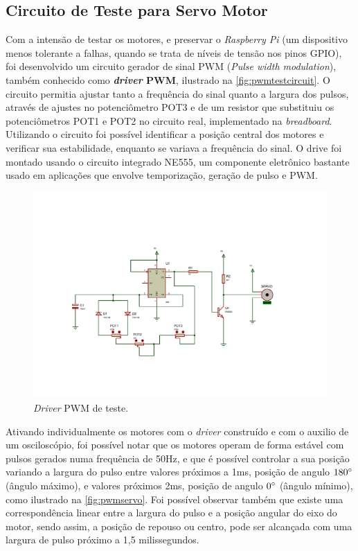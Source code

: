 \subsection{Circuito de Teste para Servo Motor}
\label{subsec:servotester}

Com a intensão de testar os motores, e preservar o \textit{Raspberry Pi} (um dispositivo menos tolerante a falhas, quando se trata de níveis de tensão nos pinos GPIO), foi desenvolvido um circuito gerador de sinal PWM (\textit{Pulse width modulation}), também conhecido como \textbf{\textit{driver} PWM}, ilustrado na \autoref{fig:pwmtestcircuit}. O circuito permitia ajustar tanto a frequência do sinal quanto a largura dos pulsos, através de ajustes no potenciômetro POT3 e de um resistor que substituiu os potenciômetros POT1 e POT2 no circuito real, implementado na \textit{breadboard}. Utilizando o circuito foi possível identificar a posição central dos motores e verificar sua estabilidade, enquanto se variava a frequência do sinal. O drive foi montado usando o circuito integrado NE555, um componente eletrônico bastante usado em aplicações que envolve temporização, geração de pulso e PWM. \par

\begin{figure}[H]
	\centering
	\includegraphics[trim={2.5cm 3cm 4cm 5cm},clip,width=1\textwidth]{figuras/pwm2.pdf}
	\caption{\textit{Driver} PWM de teste.}
	\label{fig:pwmtestcircuit}
\end{figure}

Ativando individualmente os motores com o \textit{driver} construído e com o auxilio de um osciloscópio, foi possível notar que os motores operam de forma estável com pulsos gerados numa frequência de 50Hz, e que é possível controlar a sua posição variando a largura do pulso entre valores próximos a 1ms, posição de angulo $180\degree$ (ângulo máximo), e valores próximos 2ms, posição de angulo $0\degree$ (ângulo mínimo), como ilustrado na \autoref{fig:pwmservo}. Foi possível observar também que existe uma correspondência linear entre a largura do pulso e a posição angular do eixo do motor, sendo assim, a posição de repouso ou centro, pode ser alcançada com uma largura de pulso próximo a 1,5 milissegundos. 

